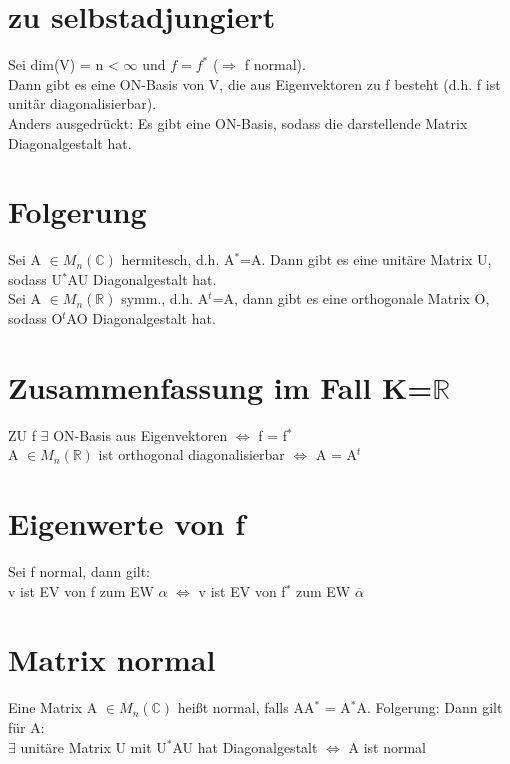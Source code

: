 \section{zu selbstadjungiert}
Sei dim(V) = n < $\infty$ und $f = f^*$ ($\Rightarrow$ f normal).\\
Dann gibt es eine ON-Basis von V, die aus Eigenvektoren zu f besteht (d.h. f ist unitär diagonalisierbar).\\
Anders ausgedrückt: Es gibt eine ON-Basis, sodass die darstellende Matrix Diagonalgestalt hat.

\section{Folgerung}
Sei A $\in M_n(\mathbb{C})$ hermitesch, d.h. A$^*$=A. Dann gibt es eine unitäre Matrix U, sodass U$^*$AU Diagonalgestalt hat.\\
Sei A $\in M_n(\mathbb{R})$ symm., d.h. A$^t$=A, dann gibt es eine orthogonale Matrix O, sodass O$^t$AO Diagonalgestalt hat.\\

\section{Zusammenfassung im Fall K=$\mathbb{R}$}
ZU f $\exists$ ON-Basis aus Eigenvektoren $\Leftrightarrow$ f = f$^*$\\
A $\in M_n(\mathbb{R})$ ist orthogonal diagonalisierbar $\Leftrightarrow$ A = A$^t$\\

\section{Eigenwerte von f}
Sei f normal, dann gilt:\\
v ist EV von f  zum EW $\alpha$ $\Leftrightarrow$ v ist EV von f$^*$ zum EW $\overline{\alpha}$

\section{Matrix normal}
Eine Matrix A $\in M_n(\mathbb{C})$ heißt normal, falls AA$^*$ = A$^*$A. Folgerung: Dann gilt für A:\\
$\exists$ unitäre Matrix U mit U$^*$AU hat Diagonalgestalt $\Leftrightarrow$ A ist normal

